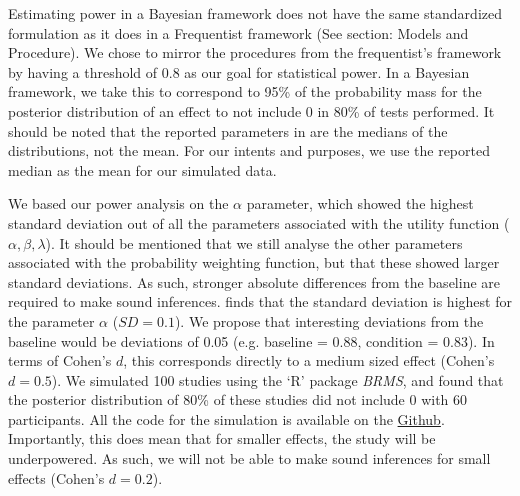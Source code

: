 \documentclass{article}
\begin{document}
Estimating power in a Bayesian framework does not have the same standardized formulation as it does in a Frequentist framework (See section: Models and Procedure). We chose to mirror the procedures from the frequentist’s framework by having a threshold of 0.8 as our goal for statistical power. In a Bayesian framework, we take this to correspond to 95\% of the probability mass for the posterior distribution of an effect to not include 0 in 80\% of tests performed. 
It should be noted that the reported parameters in  are the medians of the distributions, not the mean. For our intents and purposes, we use the reported median as the mean for our simulated data. 

We based our power analysis on the $\alpha$ parameter, which showed the highest standard deviation out of all the parameters associated with the utility function ($\alpha, \beta, \lambda$). It should be mentioned that we still analyse the other parameters associated with the probability weighting function, but that these showed larger standard deviations. As such, stronger absolute differences from the baseline are required to make sound inferences. 
 finds that the standard deviation is highest for the parameter $\alpha$ ($SD = 0.1$). We propose that interesting deviations from the baseline would be deviations of 0.05 (e.g. baseline = 0.88, condition = 0.83). In terms of Cohen’s $d$, this corresponds directly to a medium sized effect (Cohen’s $d = 0.5$). We simulated 100 studies using the ‘R’ package \textit{BRMS}, and found that the posterior distribution of 80\% of these studies did not include 0 with 60 participants. All the code for the simulation is available on the \href{https://github.com/sebsebar/Nature-Study/blob/main/PowerAnalysis/BayesianPower.Rmd}{Github}. 
Importantly, this does mean that for smaller effects, the study will be underpowered. As such, we will not be able to make sound inferences for small effects (Cohen’s $d = 0.2$).
\end{document}
